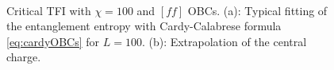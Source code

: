 	\begin{figure}[h!]
		\hspace{-0.4cm}
		\
		\caption{Critical TFI with $\chi=100$ and $[ff]$ OBCs. (a): Typical fitting of the entanglement entropy with Cardy-Calabrese formula \eqref{eq:cardyOBCs} for $L=100$. (b): Extrapolation of the central charge.}
		\label{fig:cTFI}
	\end{figure}

